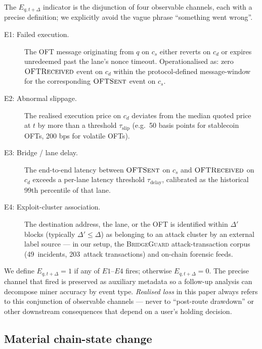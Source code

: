 \documentclass[11pt,a4paper]{article}
\begin{document}
The $E_{q, t+\Delta}$ indicator is the disjunction of four observable channels, each
with a precise definition; we explicitly avoid the vague phrase ``something went wrong''.
\begin{description}
  \item[E1: Failed execution.] The OFT message originating from $q$ on $c_s$ either
        reverts on $c_d$ or expires unredeemed past the lane's nonce timeout.
        Operationalised as: zero $\textsc{OFTReceived}$ event on $c_d$ within the
        protocol-defined message-window for the corresponding $\textsc{OFTSent}$ event on
        $c_s$.
  \item[E2: Abnormal slippage.] The realised execution price on $c_d$ deviates from the
        median quoted price at $t$ by more than a threshold $\tau_{\text{slip}}$ (e.g.\
        50 basis points for stablecoin OFTs, 200 bps for volatile OFTs).
  \item[E3: Bridge / lane delay.] The end-to-end latency between $\textsc{OFTSent}$ on
        $c_s$ and $\textsc{OFTReceived}$ on $c_d$ exceeds a per-lane latency threshold
        $\tau_{\text{delay}}$, calibrated as the historical 99th percentile of that lane.
  \item[E4: Exploit-cluster association.] The destination address, the lane, or the OFT
        is identified within $\Delta'$ blocks (typically $\Delta' \le \Delta$) as
        belonging to an attack cluster by an external label source --- in our setup, the
        \textsc{BridgeGuard} attack-transaction corpus~\cite{wu2025safeguarding}
        (49~incidents, 203~attack transactions) and on-chain forensic feeds.
\end{description}
We define $E_{q, t+\Delta} = 1$ if any of $E1$--$E4$ fires; otherwise $E_{q, t+\Delta} =
0$. The precise channel that fired is preserved as auxiliary metadata so a follow-up
analysis can decompose miner accuracy by event type. \emph{Realised loss} in this paper
always refers to this conjunction of observable channels --- never to ``post-route
drawdown'' or other downstream consequences that depend on a user's holding decision.

\subsection{Material chain-state change}\label{sec:formal:material}
\end{document}
